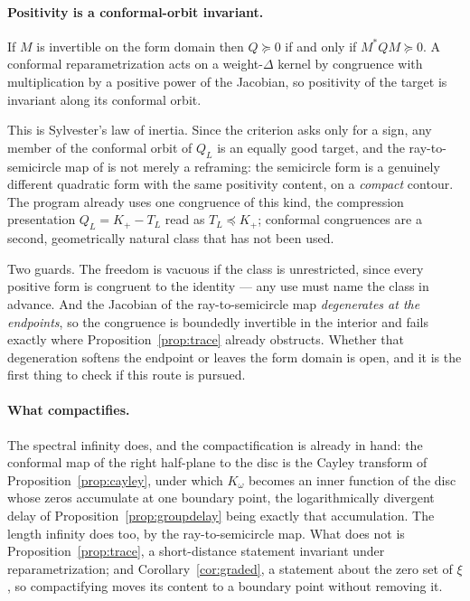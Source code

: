 \paragraph{Positivity is a conformal-orbit invariant.}
\begin{proposition}[Congruence]\label{prop:congruence}
If $M$ is invertible on the form domain then $Q\succeq0$ if and only if
$M^*QM\succeq0$. A conformal reparametrization acts on a weight-$\Delta$ kernel
by congruence with multiplication by a positive power of the Jacobian, so
positivity of the target is invariant along its conformal orbit.
\end{proposition}
This is Sylvester's law of inertia. Since the criterion asks only for a sign, any
member of the conformal orbit of $Q_L$ is an equally good target, and the
ray-to-semicircle map of \cite{OWL} is not merely a reframing: the semicircle
form is a genuinely different quadratic form with the same positivity content, on
a \emph{compact} contour. The program already uses one congruence of this kind,
the compression presentation $Q_L=K_+-T_L$ read as $T_L\preceq K_+$; conformal
congruences are a second, geometrically natural class that has not been used.

Two guards. The freedom is vacuous if the class is unrestricted, since every
positive form is congruent to the identity --- any use must name the class in
advance. And the Jacobian of the ray-to-semicircle map \emph{degenerates at the
endpoints}, so the congruence is boundedly invertible in the interior and fails
exactly where Proposition~\ref{prop:trace} already obstructs. Whether that
degeneration softens the endpoint or leaves the form domain is open, and it is the
first thing to check if this route is pursued.

\paragraph{What compactifies.} The spectral infinity does, and the
compactification is already in hand: the conformal map of the right half-plane to
the disc is the Cayley transform of Proposition~\ref{prop:cayley}, under which
$K_\omega$ becomes an inner function of the disc whose zeros accumulate at one
boundary point, the logarithmically divergent delay of
Proposition~\ref{prop:groupdelay} being exactly that accumulation. The length
infinity does too, by the ray-to-semicircle map. What does not is
Proposition~\ref{prop:trace}, a short-distance statement invariant under
reparametrization; and Corollary~\ref{cor:graded}, a statement about the zero set
of $\xi$, so compactifying moves its content to a boundary point without removing
it.


